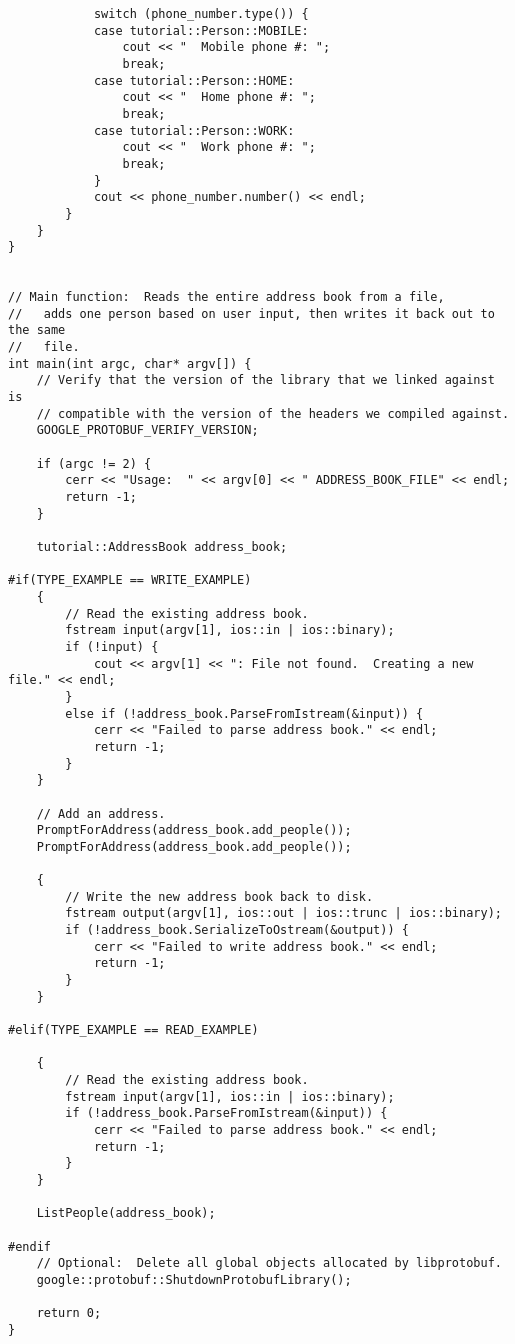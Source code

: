 \begin{lstlisting}
            switch (phone_number.type()) {
            case tutorial::Person::MOBILE:
                cout << "  Mobile phone #: ";
                break;
            case tutorial::Person::HOME:
                cout << "  Home phone #: ";
                break;
            case tutorial::Person::WORK:
                cout << "  Work phone #: ";
                break;
            }
            cout << phone_number.number() << endl;
        }
    }
}


// Main function:  Reads the entire address book from a file,
//   adds one person based on user input, then writes it back out to the same
//   file.
int main(int argc, char* argv[]) {
    // Verify that the version of the library that we linked against is
    // compatible with the version of the headers we compiled against.
    GOOGLE_PROTOBUF_VERIFY_VERSION;

    if (argc != 2) {
        cerr << "Usage:  " << argv[0] << " ADDRESS_BOOK_FILE" << endl;
        return -1;
    }

    tutorial::AddressBook address_book;

#if(TYPE_EXAMPLE == WRITE_EXAMPLE)
    {
        // Read the existing address book.
        fstream input(argv[1], ios::in | ios::binary);
        if (!input) {
            cout << argv[1] << ": File not found.  Creating a new file." << endl;
        }
        else if (!address_book.ParseFromIstream(&input)) {
            cerr << "Failed to parse address book." << endl;
            return -1;
        }
    }

    // Add an address.
    PromptForAddress(address_book.add_people());
    PromptForAddress(address_book.add_people());

    {
        // Write the new address book back to disk.
        fstream output(argv[1], ios::out | ios::trunc | ios::binary);
        if (!address_book.SerializeToOstream(&output)) {
            cerr << "Failed to write address book." << endl;
            return -1;
        }
    }

#elif(TYPE_EXAMPLE == READ_EXAMPLE)

    {
        // Read the existing address book.
        fstream input(argv[1], ios::in | ios::binary);
        if (!address_book.ParseFromIstream(&input)) {
            cerr << "Failed to parse address book." << endl;
            return -1;
        }
    }

    ListPeople(address_book);

#endif
    // Optional:  Delete all global objects allocated by libprotobuf.
    google::protobuf::ShutdownProtobufLibrary();

    return 0;
}
\end{lstlisting}

